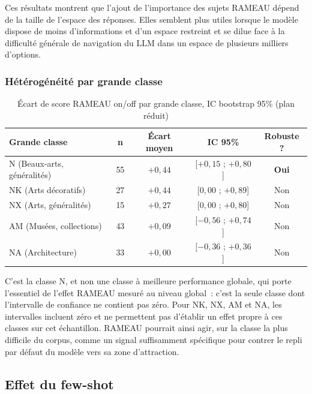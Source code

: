 Ces résultats montrent que l'ajout de l'importance des sujets RAMEAU dépend de la taille de l'espace des réponses. Elles semblent plus utiles lorsque le modèle dispose de moins d'informations et d'un espace restreint et se dilue face à la difficulté générale de navigation du LLM dans un espace de plusieurs milliers d'options.

\subsubsection*{Hétérogénéité par grande classe}

\begin{table}[h]
\centering
\begin{tabular}{lcccc}
\toprule
\textbf{Grande classe} & \textbf{n} & \textbf{Écart moyen} & \textbf{IC 95\%} & \textbf{Robuste ?} \\
\midrule
N (Beaux-arts, généralités) & 55 & $+0{,}44$ & [$+0{,}15$ ; $+0{,}80$] & \textbf{Oui} \\
NK (Arts décoratifs) & 27 & $+0{,}44$ & [$0{,}00$ ; $+0{,}89$] & Non \\
NX (Arts, généralités) & 15 & $+0{,}27$ & [$0{,}00$ ; $+0{,}80$] & Non \\
AM (Musées, collections) & 43 & $+0{,}09$ & [$-0{,}56$ ; $+0{,}74$] & Non \\
NA (Architecture) & 33 & $+0{,}00$ & [$-0{,}36$ ; $+0{,}36$] & Non \\
\bottomrule
\end{tabular}
\caption{Écart de score RAMEAU on/off par grande classe, IC bootstrap 95\% (plan réduit)}
\label{tab:rameau-par-classe}
\end{table}

C'est la classe N, et non une classe à meilleure performance globale, qui porte l'essentiel de l'effet RAMEAU mesuré au niveau global~: c'est la seule classe dont l'intervalle de confiance ne contient pas zéro. Pour NK, NX, AM et NA, les intervalles incluent zéro et ne permettent pas d'établir un effet propre à ces classes sur cet échantillon. RAMEAU pourrait ainsi agir, sur la classe la plus difficile du corpus, comme un signal suffisamment spécifique pour contrer le repli par défaut du modèle vers sa zone d'attraction.

\subsection{Effet du few-shot}
\label{sec:effet-fewshot}

